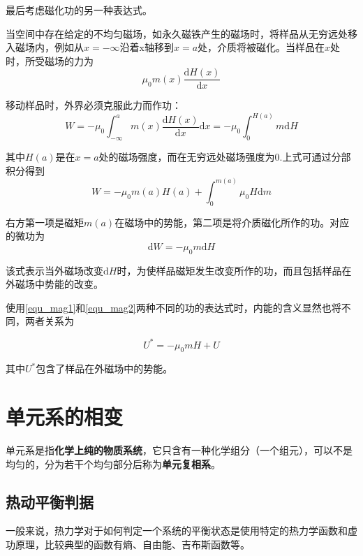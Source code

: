 \documentclass[UTF8]{ctexart}
\newcommand{\dif}{\mathrm{d}}
\begin{document}
	最后考虑磁化功的另一种表达式。
	
	当空间中存在给定的不均匀磁场，如永久磁铁产生的磁场时，将样品从无穷远处移入磁场内，例如从$ x=- \infty $沿着x轴移到$ x=a $处，介质将被磁化。当样品在$ x $处时，所受磁场的力为
	\begin{equation}
	\mu_{0} m(x) \frac{\mathrm{d} H(x)}{\mathrm{d} x}
	\end{equation}
	
\noindent 移动样品时，外界必须克服此力而作功：
\begin{equation}
W=-\mu_{0} \int_{-\infty}^{a} m(x) \frac{\mathrm{d} H(x)}{\mathrm{d} x} \mathrm{d} x=-\mu_{0} \int_{0}^{H(a)} m \mathrm{d} H
\end{equation}

\noindent 其中$ H(a) $是在$ x=a $处的磁场强度，而在无穷远处磁场强度为0.上式可通过分部积分得到
\begin{equation}
W=-\mu_{0} m(a) H(a)+\int_{0}^{m(a)} \mu_{0} H \mathrm{d} m
\end{equation}

\noindent 右方第一项是磁矩$ m(a) $在磁场中的势能，第二项是将介质磁化所作的功。对应的微功为
\begin{equation}
\mathrm{d} W=-\mu_{0} m \mathrm{d} H\label{equ_mag2}
\end{equation}

\noindent 该式表示当外磁场改变$ \dif H $时，为使样品磁矩发生改变所作的功，而且包括样品在外磁场中势能的改变。

	使用\ref{equ_mag1}和\ref{equ_mag2}两种不同的功的表达式时，内能的含义显然也将不同，两者关系为
	
	\begin{equation}
	U^{*}=-\mu_{0} m H+U
	\end{equation}
	
\noindent 其中$ U^{*} $包含了样品在外磁场中的势能。

	\section{单元系的相变}
	单元系是指\textbf{化学上纯的物质系统}，它只含有一种化学组分（一个组元），可以不是均匀的，分为若干个均匀部分后称为\textbf{单元复相系}。
	
	\subsection{热动平衡判据}
	一般来说，热力学对于如何判定一个系统的平衡状态是使用特定的热力学函数和虚功原理，比较典型的函数有熵、自由能、吉布斯函数等。
	
\end{document}
